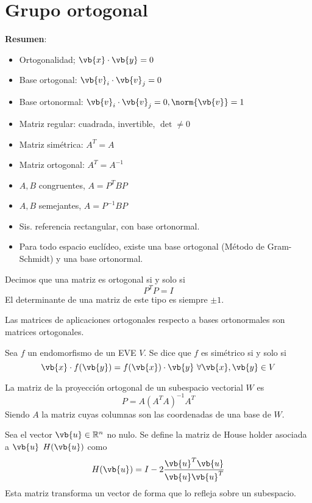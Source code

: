 \documentclass{./Geometria.tex}
\begin{document}
\chapter{Grupo ortogonal}
\textbf{Resumen}:
\begin{itemize}
    \item Ortogonalidad; \(\vb{x} \cdot \vb{y} = 0\)
    \item Base ortogonal: \(\vb{v}_i \cdot \vb{v}_j = 0\)
    \item Base ortonormal: \(\vb{v}_i \cdot \vb{v}_j = 0, \norm{\vb{v}} = 1\)
    \item Matriz regular: cuadrada, invertible, \(\det \neq 0\)
    \item Matriz simétrica: \(A^{T} = A\)
    \item Matriz ortogonal: \(A^{T} = A^{-1}\)
    \item \(A,B\) congruentes, \(A = P^{T}BP\)
    \item \(A,B\) semejantes, \(A = P^{-1}BP\)
    \item Sis. referencia rectangular, con base ortonormal.
    \item Para todo espacio euclídeo, existe una base ortogonal (Método de Gram-Schmidt) y una base ortonormal.
\end{itemize}
\begin{defin}
    Decimos que una matriz es ortogonal si y solo si
    \[
        P^{T}P = I
    \]
    El determinante de una matriz de este tipo es siempre \(\pm 1\).
\end{defin}
\begin{teorema}
    Las matrices de aplicaciones ortogonales respecto a bases ortonormales son matrices
    ortogonales.
\end{teorema}
\begin{defin}
    Sea \(f\) un endomorfismo de un EVE \(V\). Se dice que \(f\) es simétrico si y solo si
    \[
        \vb{x} \cdot f(\vb{y}) = f(\vb{x})\cdot \vb{y}~ \forall \vb{x}, \vb{y} \in V
    \]
\end{defin}
\begin{defin}
    La matriz de la proyección ortogonal de un subespacio vectorial \(W\) es
    \[
        P = A(A^{T}A)^{-1}A^{T}
    \]
    Siendo \(A\) la matriz cuyas columnas son las coordenadas de una base de \(W\).
\end{defin}
\begin{defin}
    Sea el vector \(\vb{u} \in \mathbb{R}^{n}\) no nulo. Se define la matriz
    de House holder asociada a \(\vb{u}\) \(H(\vb{u})\) como
    \[
        H(\vb{u}) = I - 2 \frac{\vb{u}^{T} \vb{u}}{\vb{u} \vb{u}^{T}}
    \]
    Esta matriz transforma un vector de forma que lo refleja sobre un subespacio.
\end{defin}
\end{document}
